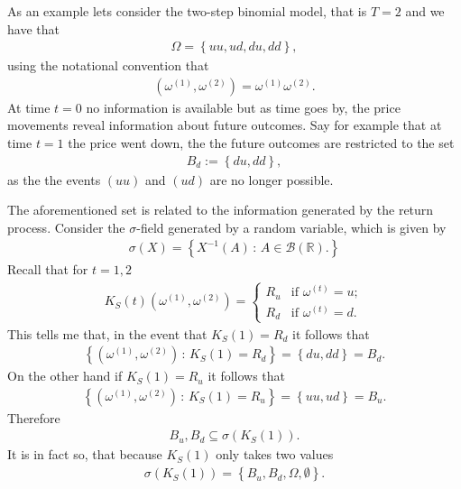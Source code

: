\documentclass{article}
\theoremstyle{definition}
\numberwithin{equation}{section}
\begin{document}
As an example lets consider the two-step binomial model, that is $T = 2$ and we have that
\begin{align}
    \Omega = \left\{ uu, ud, du, dd \right\},
\end{align}
using the notational convention that
\begin{align}
    \left(
        \omega^{(1)}, \omega^{(2)}
    \right)
    =
    \omega^{(1)}\omega^{(2)}.
\end{align}
At time $t = 0$ no information is available but as time goes by, the price movements reveal information about future outcomes.
Say for example that at time $t = 1$ the price went down, the the future outcomes are restricted to the set
\begin{align}
    B_d := \left\{ du, dd \right\},
\end{align}
as the the events $(uu)$ and $(ud)$ are no longer possible.

The aforementioned set is related to the information generated by the return process.
Consider the $\sigma$-field generated by a random variable, which is given by
\begin{align}
    \sigma(X) = \left\{
        X^{-1}(A) \, : \, A \in \mathscr{B}(\mathbb{R}).
    \right\}
\end{align}
Recall that for $t = 1,2$
\begin{align}
    K_S(t)\left(
        \omega^{(1)}, \omega^{(2)}
    \right) = 
    \begin{cases}
        R_u &\text{if } \omega^{(t)} = u; \\
        R_d &\text{if } \omega^{(t)} = d.
    \end{cases}
\end{align}
This tells me that, in the event that $K_S(1) = R_d$ it follows that
\begin{align}
    \left\{
        \left(
            \omega^{(1)}, \omega^{(2)}
        \right)
        \, : \,
        K_S(1) = R_d
    \right\} =
    \left\{
        du, dd 
    \right\} = B_d.
\end{align}
On the other hand if $K_S(1) = R_u$ it follows that
\begin{align}
    \left\{
        \left(
            \omega^{(1)}, \omega^{(2)}
        \right)
        \, : \,
        K_S(1) = R_u
    \right\} =
    \left\{
        uu, ud 
    \right\} = B_u.
\end{align}
Therefore
\begin{align}
    B_u, B_d \subseteq \sigma\left(K_S(1)\right).
\end{align}
It is in fact so, that because $K_S(1)$ only takes two values
\begin{align}
    \sigma(K_S(1)) = \left\{B_u, B_d, \Omega, \emptyset\right\}.
\end{align}
\end{document}
